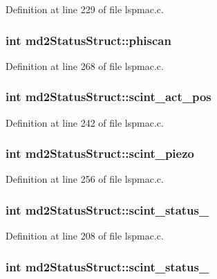 Definition at line 229 of file lspmac.c.\hypertarget{structmd2StatusStruct_abe3d4a61a15f54590b061e23b45e659c}{
\subsubsection[{phiscan}]{\setlength{\rightskip}{0pt plus 5cm}int {\bf md2StatusStruct::phiscan}}}
\label{structmd2StatusStruct_abe3d4a61a15f54590b061e23b45e659c}


Definition at line 268 of file lspmac.c.\hypertarget{structmd2StatusStruct_a1c146fc792c4285eed5b2c446c214f98}{
\subsubsection[{scint\_\-act\_\-pos}]{\setlength{\rightskip}{0pt plus 5cm}int {\bf md2StatusStruct::scint\_\-act\_\-pos}}}
\label{structmd2StatusStruct_a1c146fc792c4285eed5b2c446c214f98}


Definition at line 242 of file lspmac.c.\hypertarget{structmd2StatusStruct_a031be48adfa016c637d6eae49054c435}{
\subsubsection[{scint\_\-piezo}]{\setlength{\rightskip}{0pt plus 5cm}int {\bf md2StatusStruct::scint\_\-piezo}}}
\label{structmd2StatusStruct_a031be48adfa016c637d6eae49054c435}


Definition at line 256 of file lspmac.c.\hypertarget{structmd2StatusStruct_a1723870357f428ac5c2758a2c9a475c7}{
\subsubsection[{scint\_\-status\_\-1}]{\setlength{\rightskip}{0pt plus 5cm}int {\bf md2StatusStruct::scint\_\-status\_}}}
\label{structmd2StatusStruct_a1723870357f428ac5c2758a2c9a475c7}


Definition at line 208 of file lspmac.c.\hypertarget{structmd2StatusStruct_a4e5bc72e2f4007370f1c29ea272c952f}{
\subsubsection[{scint\_\-status\_\-2}]{\setlength{\rightskip}{0pt plus 5cm}int {\bf md2StatusStruct::scint\_\-status\_}}}
\label{structmd2StatusStruct_a4e5bc72e2f4007370f1c29ea272c952f}


